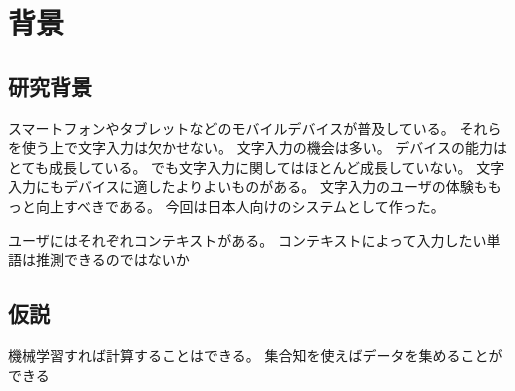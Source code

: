 \chapter{背景}
\label{chap:background}

\section{研究背景}

スマートフォンやタブレットなどのモバイルデバイスが普及している。
それらを使う上で文字入力は欠かせない。
文字入力の機会は多い。
デバイスの能力はとても成長している。
でも文字入力に関してはほとんど成長していない。
文字入力にもデバイスに適したよりよいものがある。
文字入力のユーザの体験ももっと向上すべきである。
今回は日本人向けのシステムとして作った。

ユーザにはそれぞれコンテキストがある。
コンテキストによって入力したい単語は推測できるのではないか

\section{仮説}
機械学習すれば計算することはできる。
集合知を使えばデータを集めることができる
